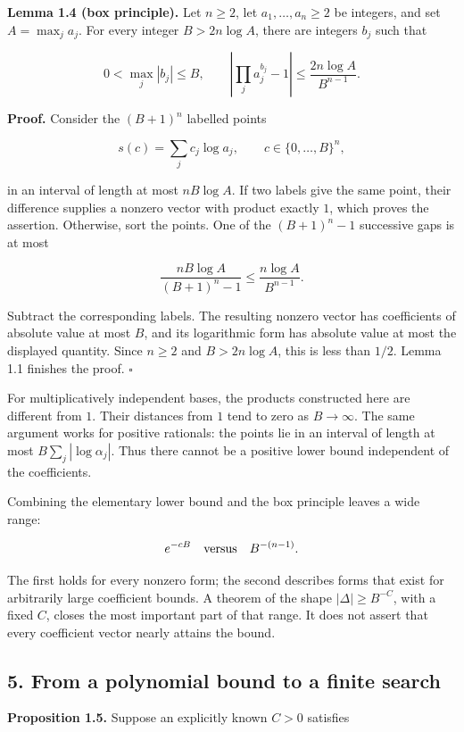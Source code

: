 \documentclass[
  11pt,
  a4paper,
]{article}
\begin{document}
\textbf{Lemma 1.4 (box principle).} Let \(n\ge2\), let
\(a_1,\ldots,a_n\ge2\) be integers, and set \(A=\max_j a_j\). For every
integer \(B>2n\log A\), there are integers \(b_j\) such that

\[
0<\max_j|b_j|\le B,
\qquad
\left|\prod_j a_j^{b_j}-1\right|\le\frac{2n\log A}{B^{n-1}}.
\]

\textbf{Proof.} Consider the \((B+1)^n\) labelled points

\[
s(c)=\sum_j c_j\log a_j,\qquad c\in\{0,\ldots,B\}^n,
\]

in an interval of length at most \(nB\log A\). If two labels give the
same point, their difference supplies a nonzero vector with product
exactly \(1\), which proves the assertion. Otherwise, sort the points.
One of the \((B+1)^n-1\) successive gaps is at most

\[
\frac{nB\log A}{(B+1)^n-1}\le\frac{n\log A}{B^{n-1}}.
\]

Subtract the corresponding labels. The resulting nonzero vector has
coefficients of absolute value at most \(B\), and its logarithmic form
has absolute value at most the displayed quantity. Since \(n\ge2\) and
\(B>2n\log A\), this is less than \(1/2\). Lemma 1.1 finishes the proof.
\(\square\)

For multiplicatively independent bases, the products constructed here
are different from \(1\). Their distances from \(1\) tend to zero as
\(B\to\infty\). The same argument works for positive rationals: the
points lie in an interval of length at most \(B\sum_j|\log\alpha_j|\).
Thus there cannot be a positive lower bound independent of the
coefficients.

Combining the elementary lower bound and the box principle leaves a wide
range:

\[
e^{-cB}\quad\hbox{versus}\quad B^{-(n-1)}.
\]

The first holds for every nonzero form; the second describes forms that
exist for arbitrarily large coefficient bounds. A theorem of the shape
\(|\Delta|\ge B^{-C}\), with a fixed \(C\), closes the most important
part of that range. It does not assert that every coefficient vector
nearly attains the bound.

\subsection{5. From a polynomial bound to a finite
search}\label{from-a-polynomial-bound-to-a-finite-search}

\textbf{Proposition 1.5.} Suppose an explicitly known \(C>0\) satisfies
\end{document}
